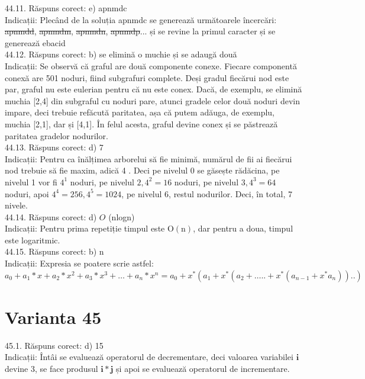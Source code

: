 44.11. Răspuns corect: e) apnmdc\\
Indicații: Plecând de la soluția apnmdc se generează următoarele încercări: \sout{apnmdd}, \sout{apnmdm}, \sout{apnmdn}, \sout{apnmdp}... și se revine la primul caracter și se generează ebacid\\

44.12. Răspuns corect: b) se elimină o muchie și se adaugă două\\
Indicații: Se observă că graful are două componente conexe. Fiecare componentă conexă are 501 noduri, fiind subgrafuri complete. Deși gradul fiecărui nod este par, graful nu este eulerian pentru că nu este conex. Dacă, de exemplu, se elimină muchia [2,4] din subgraful cu noduri pare, atunci gradele celor două noduri devin impare, deci trebuie refăcută paritatea, așa că putem adăuga, de exemplu, muchia [2,1], dar și [4,1]. În felul acesta, graful devine conex și se păstrează paritatea gradelor nodurilor.\\

44.13. Răspuns corect: d) 7\\
Indicații: Pentru ca înălțimea arborelui să fie minimă, numărul de fii ai fiecărui nod trebuie să fie maxim, adică 4 . Deci pe nivelul 0 se găsește rădăcina, pe nivelul 1 vor fi $4^{1}$ noduri, pe nivelul $2,4^{2}=16$ noduri, pe nivelul $3,4^{3}=64$ noduri, apoi $4^{4}=256,4^{5}=1024$, pe nivelul 6, restul nodurilor. Deci, în total, 7 nivele.\\

44.14. Răspuns corect: d) $O$ (nlogn)\\
Indicații: Pentru prima repetiție timpul este $\mathrm{O}(\mathrm{n})$, dar pentru a doua, timpul este logaritmic.\\

44.15. Răspuns corect: b) n\\
Indicații: Expresia se poatere scrie astfel:
$a_{0}+a_{1} * x+a_{2} * x^{2}+a_{3} * x^{3}+\ldots+a_{n} * x^{n}=a_{0}+x^{*}\left(a_{1}+x^{*}\left(a_{2}+\ldots . .+x^{*}\left(a_{n-1}+x^{*} a_{n}\right)\right) ..\right)$\\

\section*{Varianta 45}

45.1. Răspuns corect: d) 15\\
Indicații: Întâi se evaluează operatorul de decrementare, deci valoarea variabilei $\mathbf{i}$ devine 3, se face produsul $\mathbf{i*j}$ și apoi se evaluează operatorul de incrementare.\\

